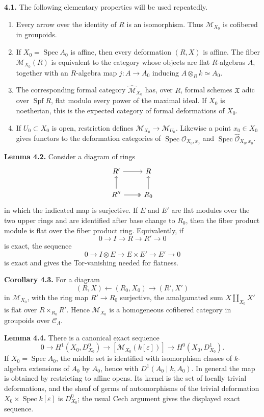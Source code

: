 \documentclass[11pt]{article}
\providecommand{\Spec}{\operatorname{Spec}}
\providecommand{\Spf}{\operatorname{Spf}}
\begin{document}
\textbf{4.1.} The following elementary properties will be used repeatedly.
\begin{enumerate}[label=(\alph*)]
\item Every arrow over the identity of \(R\) is an isomorphism. Thus \(\mathcal M_{X_0}\) is cofibered in groupoids.
\item If \(X_0=\Spec A_0\) is affine, then every deformation \((R,X)\) is affine. The fiber \(\mathcal M_{X_0}(R)\) is equivalent to the category whose objects are flat \(R\)-algebras \(A\), together with an \(R\)-algebra map \(j:A\to A_0\) inducing \(A\otimes_R k\simeq A_0\).
\item The corresponding formal category \(\widehat{\mathcal M}_{X_0}\) has, over \(R\), formal schemes \(\mathfrak X\) adic over \(\Spf R\), flat modulo every power of the maximal ideal. If \(X_0\) is noetherian, this is the expected category of formal deformations of \(X_0\).
\item If \(U_0\subset X_0\) is open, restriction defines \(\mathcal M_{X_0}\to\mathcal M_{U_0}\). Likewise a point \(x_0\in X_0\) gives functors to the deformation categories of \(\Spec \mathcal O_{X_0,x_0}\) and \(\Spec \widehat{\mathcal O}_{X_0,x_0}\).
\end{enumerate}

\textbf{Lemma 4.2.} Consider a diagram of rings
\[
\begin{tikzcd}
 R' \arrow[r] & R\\
 R'' \arrow[u] \arrow[r,two heads] & R_0 \arrow[u]
\end{tikzcd}
\]
in which the indicated map is surjective. If \(E\) and \(E'\) are flat modules over the two upper rings and are identified after base change to \(R_0\), then the fiber product module is flat over the fiber product ring. Equivalently, if
\[
 0\to I\to R\to R'\to 0
\]
is exact, the sequence
\[
 0\to I\otimes E\to E\times E'\to E'\to 0
\]
is exact and gives the Tor-vanishing needed for flatness.

\textbf{Corollary 4.3.} For a diagram
\[
 (R,X)\longleftarrow(R_0,X_0)\longrightarrow(R',X')
\]
in \(\mathcal M_{X_0}\), with the ring map \(R'\to R_0\) surjective, the amalgamated sum \(X\amalg_{X_0}X'\) is flat over \(R\times_{R_0}R'\). Hence \(\mathcal M_{X_0}\) is a homogeneous cofibered category in groupoids over \(\mathcal C_\Lambda\).

\textbf{Lemma 4.4.} There is a canonical exact sequence
\[
 0\to H^1(X_0,D^0_{X_0})\to [\mathcal M_{X_0}(k[\varepsilon])]
 \to H^0(X_0,D^1_{X_0}).
\]
If \(X_0=\Spec A_0\), the middle set is identified with isomorphism classes of \(k\)-algebra extensions of \(A_0\) by \(A_0\), hence with \(D^1(A_0\mid k,A_0)\). In general the map is obtained by restricting to affine opens. Its kernel is the set of locally trivial deformations, and the sheaf of germs of automorphisms of the trivial deformation \(X_0\times\Spec k[\varepsilon]\) is \(D^0_{X_0}\); the usual Cech argument gives the displayed exact sequence.
\end{document}
